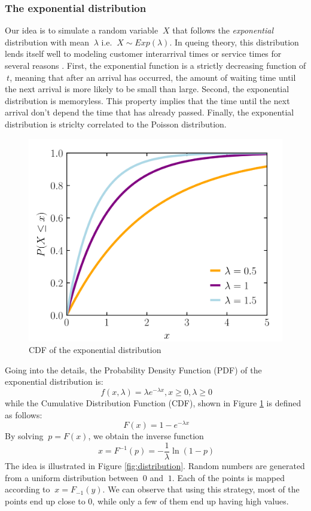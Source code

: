 \subsubsection{The exponential distribution}
Our idea is to simulate a random variable \(\ X \) that follows the \textit{exponential} distribution with mean \(\ \lambda \) i.e. \(\ X \sim Exp(\lambda) \). In queing theory, this distribution lends itself well to modeling customer interarrival times or service times for several reasons \cite{QUEUING_THEORY}. First, the exponential function is a strictly decreasing function of \(\ t \), meaning that after an arrival has occurred, the amount of waiting time until the next arrival is more likely to be small than large. Second, the exponential distribution is memoryless. This property implies that the time until the next arrival don't depend the time that has already passed. Finally, the exponential distribution is striclty correlated to the Poisson distribution.
\begin{figure}[H]
    \centering
    \includegraphics[width=0.7\linewidth]{images/countermeasures/cumulative_distribution_function.png}
    \caption{CDF of the exponential distribution}
    \label{fig:cdf}
\end{figure}
Going into the details, the Probability Density Function (PDF) of the exponential distribution is:
\[\ f(x, \lambda ) = \lambda e^{-\lambda x}, x \geq 0, \lambda \geq 0 \]
while the Cumulative Distribution Function (CDF), shown in Figure \ref{fig:cdf} is defined as follows:
\[\ F(x) = 1 - e^{-\lambda x} \]
By solving \(\ p = F(x) \), we obtain the inverse function
\[\ x = F^{-1}(p) = -\frac{1}{\lambda}\ln(1-p) \]
The idea is illustrated in Figure \ref{fig:distribution}. Random numbers are generated from a uniform distribution between \(\ 0 \) and \(\ 1 \). Each of the points is mapped according to \(\ x = F_{-1}(y) \). We can observe that using this strategy, most of the points end up close to 0, while only a few of them end up having high values.
